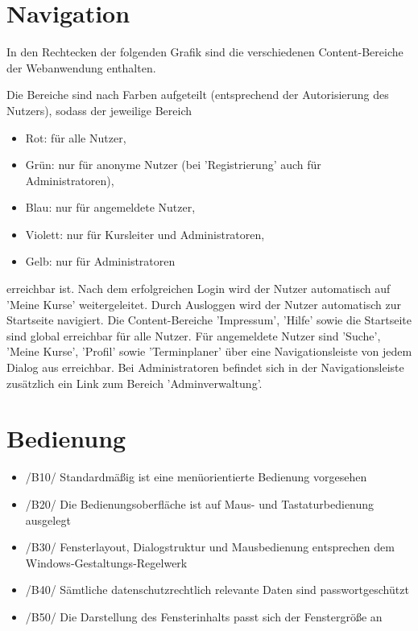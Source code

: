 \documentclass[a4paper]{scrreprt}
\begin{document}
	    \subsection{}
    
    \section{Navigation}
	    In den Rechtecken der folgenden Grafik sind die verschiedenen Content-Bereiche der Webanwendung enthalten.
		    \newline
		    \newline
		    \newline
    
	    Die Bereiche sind  nach Farben aufgeteilt (entsprechend der Autorisierung des Nutzers), sodass der jeweilige Bereich
	    \begin{itemize}
		    \item Rot: für alle Nutzer,
		    \item Grün: nur für anonyme Nutzer (bei 'Registrierung' auch für Administratoren),
		    \item Blau: nur für angemeldete Nutzer,
		    \item Violett: nur für Kursleiter und Administratoren,
		    \item Gelb: nur für Administratoren
	    \end{itemize}
	    erreichbar ist.
	    \newline
	    Nach dem erfolgreichen Login wird der Nutzer automatisch auf 'Meine Kurse' weitergeleitet.
	    \newline
	    Durch Ausloggen wird der Nutzer automatisch zur Startseite navigiert.
	    \newline
	    Die Content-Bereiche 'Impressum', 'Hilfe' sowie die Startseite sind global erreichbar für alle Nutzer.
	    \newline
	    Für angemeldete Nutzer sind 'Suche', 'Meine Kurse', 'Profil' sowie 'Terminplaner' über eine Navigationsleiste von jedem Dialog aus erreichbar.
	    \newline
	    Bei Administratoren befindet sich in der Navigationsleiste zusätzlich ein Link zum Bereich 'Adminverwaltung'.
        
    \section{Bedienung}       
	    \begin{itemize}
			\item /B10/ Standardmäßig ist eine menüorientierte Bedienung vorgesehen
			\item /B20/ Die Bedienungsoberfläche ist auf Maus- und Tastaturbedienung ausgelegt
			\item /B30/ Fensterlayout, Dialogstruktur und Mausbedienung entsprechen dem Windows-Gestaltungs-Regelwerk
			\item /B40/ Sämtliche datenschutzrechtlich relevante Daten sind passwortgeschützt
			\item /B50/ Die Darstellung des Fensterinhalts passt sich der Fenstergröße an
		\end{itemize}
            
\end{document}
